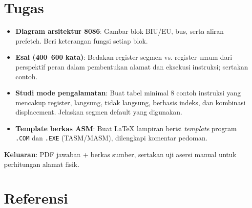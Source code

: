 \section{Tugas}
\begin{itemize}
  \item \textbf{Diagram arsitektur 8086}: Gambar blok BIU/EU, bus, serta aliran prefetch. Beri keterangan fungsi setiap blok.
  \item \textbf{Esai (400--600 kata)}: Bedakan register segmen vs. register umum dari perspektif peran dalam pembentukan alamat dan eksekusi instruksi; sertakan contoh.
  \item \textbf{Studi mode pengalamatan}: Buat tabel minimal 8 contoh instruksi yang mencakup register, langsung, tidak langsung, berbasis indeks, dan kombinasi displacement. Jelaskan segmen default yang digunakan.
  \item \textbf{Template berkas ASM}: Buat \LaTeX{} lampiran berisi \textit{template} program \texttt{.COM} dan \texttt{.EXE} (TASM/MASM), dilengkapi komentar pedoman.
\end{itemize}
\noindent\textbf{Keluaran}: PDF jawaban + berkas sumber, sertakan uji asersi manual untuk perhitungan alamat fisik.

\section{Referensi}
